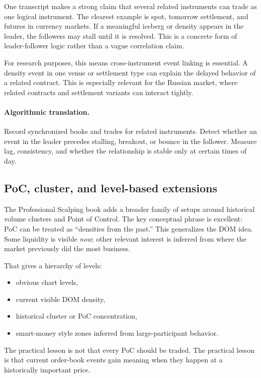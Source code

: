 One transcript makes a strong claim that several related instruments can trade as one logical
instrument. The clearest example is spot, tomorrow settlement, and futures in currency markets.
If a meaningful iceberg or density appears in the leader, the followers may stall until it is
resolved. This is a concrete form of leader-follower logic rather than a vague correlation
claim.

For research purposes, this means cross-instrument event linking is essential. A density event
in one venue or settlement type can explain the delayed behavior of a related contract. This is
especially relevant for the Russian market, where related contracts and settlement variants can
interact tightly.

\paragraph{Algorithmic translation.}
Record synchronized books and trades for related instruments. Detect whether an event in the
leader precedes stalling, breakout, or bounce in the follower. Measure lag, consistency, and
whether the relationship is stable only at certain times of day.

\subsection{PoC, cluster, and level-based extensions}

The Professional Scalping book adds a broader family of setups around historical volume
clusters and Point of Control. The key conceptual phrase is excellent: PoC can be treated as
``densities from the past.'' This generalizes the DOM idea. Some liquidity is visible \emph{now};
other relevant interest is inferred from where the market previously did the most business.

That gives a hierarchy of levels:

\begin{itemize}[leftmargin=1.4em]
  \item obvious chart levels,
  \item current visible DOM density,
  \item historical cluster or PoC concentration,
  \item smart-money style zones inferred from large-participant behavior.
\end{itemize}

The practical lesson is not that every PoC should be traded. The practical lesson is that
current order-book events gain meaning when they happen at a historically important price.

